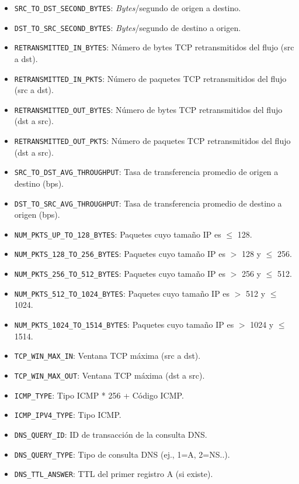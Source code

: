 \begin{itemize}
    \item \texttt{SRC\_TO\_DST\_SECOND\_BYTES}: \textit{Bytes}/segundo de origen a destino.
    \item \texttt{DST\_TO\_SRC\_SECOND\_BYTES}: \textit{Bytes}/segundo de destino a origen.
    \item \texttt{RETRANSMITTED\_IN\_BYTES}: Número de bytes TCP retransmitidos del flujo (src a dst).
    \item \texttt{RETRANSMITTED\_IN\_PKTS}: Número de paquetes TCP retransmitidos del flujo (src a dst).
    \item \texttt{RETRANSMITTED\_OUT\_BYTES}: Número de bytes TCP retransmitidos del flujo (dst a src).
    \item \texttt{RETRANSMITTED\_OUT\_PKTS}: Número de paquetes TCP retransmitidos del flujo (dst a src).
    \item \texttt{SRC\_TO\_DST\_AVG\_THROUGHPUT}: Tasa de transferencia promedio de origen a destino (bps).
    \item \texttt{DST\_TO\_SRC\_AVG\_THROUGHPUT}: Tasa de transferencia promedio de destino a origen (bps).
    \item \texttt{NUM\_PKTS\_UP\_TO\_128\_BYTES}: Paquetes cuyo tamaño IP es $ \leq $ 128.
    \item \texttt{NUM\_PKTS\_128\_TO\_256\_BYTES}: Paquetes cuyo tamaño IP es  $ > $ 128 y $ \leq $ 256.
    \item \texttt{NUM\_PKTS\_256\_TO\_512\_BYTES}: Paquetes cuyo tamaño IP es $ > $ 256 y $ \leq $ 512.
    \item \texttt{NUM\_PKTS\_512\_TO\_1024\_BYTES}: Paquetes cuyo tamaño IP es $ > $ 512 y $ \leq $ 1024.
    \item \texttt{NUM\_PKTS\_1024\_TO\_1514\_BYTES}: Paquetes cuyo tamaño IP es $ > $ 1024 y $ \leq $ 1514.
    \item \texttt{TCP\_WIN\_MAX\_IN}: Ventana TCP máxima (src a dst).
    \item \texttt{TCP\_WIN\_MAX\_OUT}: Ventana TCP máxima (dst a src).
    \item \texttt{ICMP\_TYPE}: Tipo ICMP * 256 + Código ICMP.
    \item \texttt{ICMP\_IPV4\_TYPE}: Tipo ICMP.
    \item \texttt{DNS\_QUERY\_ID}: ID de transacción de la consulta DNS.
    \item \texttt{DNS\_QUERY\_TYPE}: Tipo de consulta DNS (ej., 1=A, 2=NS..).
    \item \texttt{DNS\_TTL\_ANSWER}: TTL del primer registro A (si existe).

\end{itemize}
